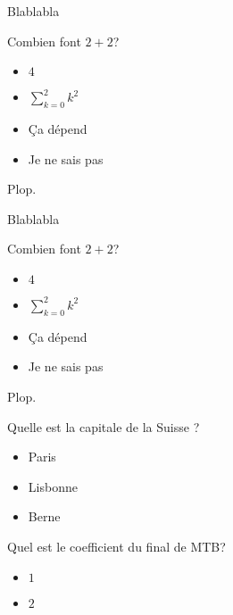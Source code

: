 
\begin{frame}
     Blablabla
    \begin{clickers}
        Combien font $2+2$?
        \begin{itemize}
         \item $4$
         \item $\displaystyle\sum_{k=0}^2k^2$
         \item Ça dépend
         \item Je ne sais pas
        \end{itemize}
    \end{clickers}
    
    \begin{definition}
         Plop.
    \end{definition}
\end{frame}

\begin{frame}
     Blablabla
    \begin{plop}
        Combien font $2+2$?
        \begin{itemize}
         \item $4$
         \item $\sum_{k=0}^2k^2$
         \item Ça dépend
         \item Je ne sais pas
        \end{itemize}
    \end{plop}
    
    \begin{definition}
         Plop.
    \end{definition}
\end{frame}

\begin{frame}
    \begin{clickers}
        Quelle est la capitale de la Suisse ?
        \begin{itemize}
         \item Paris
         \item Lisbonne
         \item Berne
        \end{itemize}
    \end{clickers}
\end{frame}

\begin{clickers}
    Quel est le coefficient du final de MTB?
    \begin{itemize}
     \item $1$
     \item $2$
    \end{itemize}
\end{clickers}